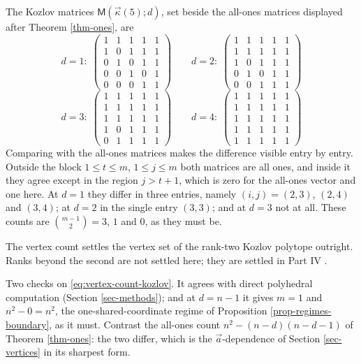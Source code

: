 \documentclass[11pt, a4paper, abstract=yes]{scrartcl}
\theoremstyle{definition}
\theoremstyle{remark}
\theoremstyle{plain}
\newcommand{\kozvec}{\vec\kappa}
\newcommand{\extten}{\mathsf{M}}
\let\autocite\cite
\begin{document}
The Kozlov matrices \(\extten(\kozvec(5);d)\), set beside the all-ones matrices
displayed after Theorem \ref{thm-ones}, are
\[
d=1:\;\begin{pmatrix}1&1&1&1&1\\1&0&1&1&1\\0&1&0&1&1\\0&0&1&0&1\\0&0&0&1&1\end{pmatrix} \qquad d=2:\;\begin{pmatrix}1&1&1&1&1\\1&1&1&1&1\\1&0&1&1&1\\0&1&0&1&1\\0&0&1&1&1\end{pmatrix}
\]
\[
d=3:\;\begin{pmatrix}1&1&1&1&1\\1&1&1&1&1\\1&1&1&1&1\\1&0&1&1&1\\0&1&1&1&1\end{pmatrix} \qquad d=4:\;\begin{pmatrix}1&1&1&1&1\\1&1&1&1&1\\1&1&1&1&1\\1&1&1&1&1\\1&1&1&1&1\end{pmatrix}
\]
Comparing with the all-ones matrices makes the difference visible entry by entry. Outside the block
\(1\le t\le m\), \(1\le j\le m\) both matrices are all ones, and inside it they agree except in the
region \(j>t+1\), which is zero for the all-ones vector and one here. At \(d=1\) they
differ in three entries, namely \((i,j)=(2,3)\), \((2,4)\) and \((3,4)\); at \(d=2\) in the single
entry \((3,3)\); and at \(d=3\) not at all. These counts are \(\binom{m-1}{2}=3\), \(1\) and \(0\),
as they must be.

The vertex count settles the vertex set of the rank-two Kozlov polytope outright. Ranks beyond the
second are not settled here; they are settled in Part IV \autocite{SnellmanArticle4}.

Two checks on \eqref{eq:vertex-count-kozlov}. It agrees with direct polyhedral computation
(Section \ref{sec-methods}); and at \(d=n-1\) it gives \(m=1\) and \(n^2-0=n^2\), the
one-shared-coordinate regime of Proposition \ref{prop-regimes-boundary}, as it must. Contrast the
all-ones count \(n^2-(n-d)(n-d-1)\) of Theorem \ref{thm-ones}: the two differ, which is the
\(\vec a\)-dependence of Section \ref{sec-vertices} in its sharpest form.
\end{document}
